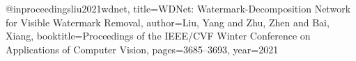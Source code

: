@inproceedings{liu2021wdnet,
  title={WDNet: Watermark-Decomposition Network for Visible Watermark Removal},
  author={Liu, Yang and Zhu, Zhen and Bai, Xiang},
  booktitle={Proceedings of the IEEE/CVF Winter Conference on Applications of Computer Vision},
  pages={3685--3693},
  year={2021}
}